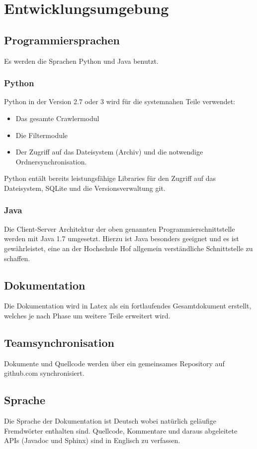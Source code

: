\chapter{Entwicklungsumgebung} \label{spec:req:devenv}
\section{Programmiersprachen}
	Es werden die Sprachen Python und Java benutzt.
	\subsection{Python}
		Python in der Version 2.7 oder 3 wird für die systemnahen Teile verwendet:
		\begin{itemize}
			\item Das gesamte Crawlermodul
			\item Die Filtermodule
			\item Der Zugriff auf das Dateisystem (Archiv) und die notwendige Ordnersynchronisation.
		\end{itemize}
		Python entält bereits leistungsfähige Libraries für den Zugriff auf das Dateisystem, SQLite und 
		die Versionsverwaltung git.
	\subsection{Java}
		Die Client-Server Architektur der oben genannten Programmierschnittstelle werden 
		mit Java 1.7 umgesetzt.
		Hierzu ist Java besonders geeignet und es ist gewährleistet, 
		eine an der Hochschule Hof allgemein verständliche Schnittstelle zu schaffen.
\section{Dokumentation}
	Die Dokumentation wird in Latex als ein fortlaufendes Gesamtdokument erstellt, 
	welches je nach Phase um weitere Teile erweitert wird.
\section{Teamsynchronisation}
	Dokumente und Quellcode werden über ein gemeinsames Repository auf github.com synchronisiert.
\section{Sprache}	
	Die Sprache der Dokumentation ist Deutsch wobei natürlich geläufige Fremdwörter enthalten sind. 
	Quellcode, Kommentare und daraus abgeleitete APIs (Javadoc und Sphinx) sind in Englisch zu verfassen.
